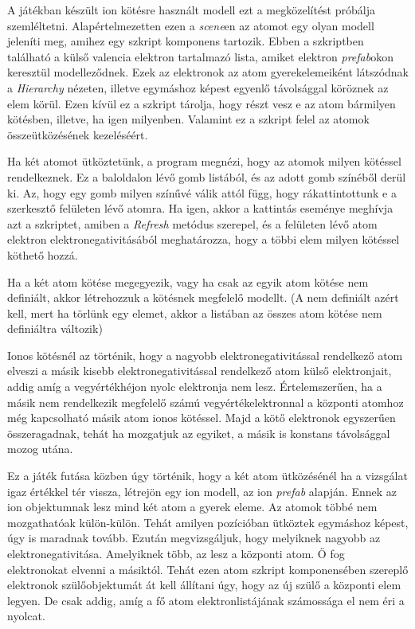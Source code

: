 \documentclass[colorlinks]{thesis-ekf}
\theoremstyle{definition}
\theoremstyle{remark}
\begin{document}
A játékban készült ion kötésre használt modell ezt a megközelítést próbálja szemléltetni. Alapértelmezetten ezen a \textit{scene}en az atomot egy olyan modell jeleníti meg, amihez egy szkript komponens tartozik. Ebben a szkriptben található a külső valencia elektron tartalmazó lista, amiket elektron\textit{ prefab}okon keresztül modelleződnek. Ezek az elektronok az atom gyerekelemeiként látszódnak a \textit{Hierarchy} nézeten, illetve egymáshoz képest egyenlő távolsággal köröznek az elem körül. Ezen kívül ez a szkript tárolja, hogy részt vesz e az atom bármilyen kötésben, illetve, ha igen milyenben. Valamint ez a szkript felel az atomok összeütközésének kezeléséért.

Ha két atomot ütköztetünk, a program megnézi, hogy az atomok milyen kötéssel rendelkeznek. Ez a baloldalon lévő gomb listából, és az adott gomb színéből derül ki. Az, hogy egy gomb milyen színűvé válik attól függ, hogy rákattintottunk e a szerkesztő felületen lévő atomra. Ha igen, akkor a kattintás eseménye meghívja azt a szkriptet, amiben a \textit{Refresh} metódus szerepel, és a felületen lévő atom elektron elektronegativitásából meghatározza, hogy a többi elem milyen kötéssel köthető hozzá.

Ha a két atom kötése megegyezik, vagy ha csak az egyik atom kötése nem definiált, akkor létrehozzuk a kötésnek megfelelő modellt. (A nem definiált azért kell, mert ha törlünk egy elemet, akkor a listában az összes atom kötése nem definiáltra változik)

Ionos kötésnél az történik, hogy a nagyobb elektronegativitással rendelkező atom elveszi a másik kisebb elektronegativitással rendelkező atom külső elektronjait, addig amíg a vegyértékhéjon nyolc elektronja nem lesz. Értelemszerűen, ha a másik nem rendelkezik megfelelő számú vegyértékelektronnal a központi atomhoz még kapcsolható másik atom ionos kötéssel. Majd a kötő elektronok egyszerűen összeragadnak, tehát ha mozgatjuk az egyiket, a másik is konstans távolsággal mozog utána.

Ez a játék futása közben úgy történik, hogy a két atom ütközésénél ha a vizsgálat igaz értékkel tér vissza, létrejön egy ion modell, az ion \textit{prefab} alapján. Ennek az ion objektumnak lesz mind két atom a gyerek eleme. Az atomok többé nem mozgathatóak külön-külön. Tehát amilyen pozícióban ütköztek egymáshoz képest, úgy is maradnak tovább.  Ezután megvizsgáljuk, hogy melyiknek nagyobb az elektronegativitása. Amelyiknek több, az lesz a központi atom. Ő fog elektronokat elvenni a másiktól. Tehát ezen atom szkript komponensében szereplő elektronok szülőobjektumát át kell állítani úgy, hogy az új szülő a központi elem legyen. De csak addig, amíg a fő atom elektronlistájának számossága el nem éri a nyolcat.
\end{document}
